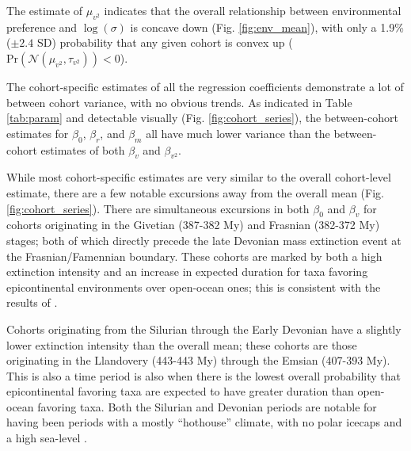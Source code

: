 \documentclass{article}
\begin{document}
The estimate of \(\mu_{v^{2}}\) indicates that the overall relationship between environmental preference and \(\log(\sigma)\) is concave down (Fig. \ref{fig:env_mean}), with only a 1.9\% (\(\pm 2.4\) SD) probability that any given cohort is convex up (\(\mathrm{Pr}\left(\mathcal{N}(\mu_{v^{2}}, \tau_{v^{2}})\right) < 0\)).

The cohort-specific estimates of all the regression coefficients demonstrate a lot of between cohort variance, with no obvious trends. As indicated in Table \ref{tab:param} and detectable visually (Fig. \ref{fig:cohort_series}), the between-cohort estimates for \(\beta_{0}\), \(\beta_{r}\), and \(\beta_{m}\) all have much lower variance than the between-cohort estimates of both \(\beta_{v}\) and \(\beta_{v^{2}}\).

While most cohort-specific estimates are very similar to the overall cohort-level estimate, there are a few notable excursions away from the overall mean (Fig. \ref{fig:cohort_series}). There are simultaneous excursions in both \(\beta_{0}\) and \(\beta_{v}\) for cohorts originating in the Givetian (387-382 My) and Frasnian (382-372 My) stages; both of which directly precede the late Devonian mass extinction event at the Frasnian/Famennian boundary. These cohorts are marked by both a high extinction intensity and an increase in expected duration for taxa favoring epicontinental environments over open-ocean ones; this is consistent with the results of \citet{Miller2009a}.

Cohorts originating from the Silurian through the Early Devonian have a slightly lower extinction intensity than the overall mean; these cohorts are those originating in the Llandovery (443-443 My) through the Emsian (407-393 My). This is also a time period is also when there is the lowest overall probability that epicontinental favoring taxa are expected to have greater duration than open-ocean favoring taxa. Both the Silurian and Devonian periods are notable for having been periods with a mostly ``hothouse'' climate, with no polar icecaps and a high sea-level \citep{Edwards1985,Joachimski2009,Munnecke2010}.
\end{document}
